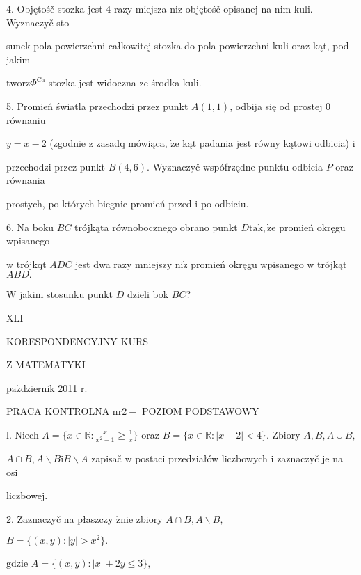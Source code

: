 \documentclass[a4paper,12pt]{article}
\begin{document}
4. Objętośč stozka jest 4 razy miejsza $\mathrm{n}\mathrm{i}\dot{\mathrm{z}}$ objętośč opisanej na nim kuli. Wyznaczyč sto-

sunek pola powierzchni całkowitej stozka do pola powierzchni kuli oraz kąt, pod jakim

$\mathrm{t}\mathrm{w}\mathrm{o}\mathrm{r}\mathrm{z}\Phi^{\mathrm{C}\mathrm{a}}$ stozka jest widoczna ze środka kuli.

5. Promień światla przechodzi przez punkt $A(1,1)$, odbija się od prostej $0$ równaniu

$y = x-2$ (zgodnie $\mathrm{z}$ zasadq mówiąca, $\dot{\mathrm{z}}\mathrm{e}$ kąt padania jest równy kątowi odbicia) $\mathrm{i}$

przechodzi przez punkt $B(4,6)$. Wyznaczyč wspófrzędne punktu odbicia $P$ oraz równania

prostych, po których biegnie promień przed $\mathrm{i}$ po odbiciu.

6. Na boku $BC$ trójkąta równobocznego obrano punkt $D\mathrm{t}\mathrm{a}\mathrm{k}, \dot{\mathrm{z}}\mathrm{e}$ promień okręgu wpisanego

$\mathrm{w}$ trójkqt $ADC$ jest dwa razy mniejszy $\mathrm{n}\mathrm{i}\dot{\mathrm{z}}$ promień okręgu wpisanego $\mathrm{w}$ trójkąt $ABD.$

$\mathrm{W}$ jakim stosunku punkt $D$ dzieli bok $BC$?





XLI

KORESPONDENCYJNY KURS

Z MATEMATYKI

$\mathrm{p}\mathrm{a}\acute{\mathrm{z}}$dziernik 2011 $\mathrm{r}.$

PRACA KONTROLNA $\mathrm{n}\mathrm{r} 2-$ POZIOM PODSTAWOWY

l. Niech $A=\displaystyle \{x\in \mathbb{R}:\frac{x}{x^{2}-1}\geq\frac{1}{x}\}$ oraz $B=\{x\in \mathbb{R}:|x+2|<4\}$. Zbiory $A, B, A\cup B,$

$A\cap B, A\backslash B\mathrm{i}B\backslash A$ zapisač $\mathrm{w}$ postaci przedziałów liczbowych $\mathrm{i}$ zaznaczyč je na osi

liczbowej.

2. Zaznaczyč na płaszczy $\acute{\mathrm{z}}\mathrm{n}\mathrm{i}\mathrm{e}$ zbiory $A\cap B, A\backslash B,$

$B=\{(x,y):|y|>x^{2}\}.$

gdzie $A = \{(x,y):|x|+2y\leq 3\},$
\end{document}
